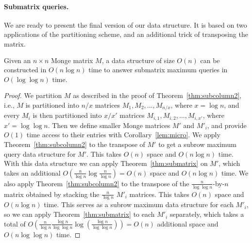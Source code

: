 \documentclass{llncs}
\begin{document}
\paragraph{\bf Submatrix queries.}
We are ready to present the final version of our data structure. It is based on two
applications of the partitioning scheme, and an additional trick of transposing the matrix.

\begin{theorem}
\label{thm:submatrix2}
Given an $n\times n$ Monge matrix $M$, a data structure of size $O(n)$ can be constructed
in $O(n\log n)$ time to answer submatrix maximum queries in $O(\log\log n)$ time.
\end{theorem}

\begin{proof}
We partition $M$ as described in the proof of Theorem~\ref{thm:subcolumn2}, i.e., $M$ is
partitioned into $n/x$ matrices $M_{1},M_{2},\ldots,M_{n/x}$, where $x=\log n$, and every $M_{i}$
is then partitioned into $x/x'$ matrices $M_{i,1},M_{i,2},\ldots,M_{i,x'}$, where $x'=\log\log n$.
Then we define smaller Monge matrices $M'$ and $M'_{i}$, and provide $O(1)$ time access to their
entries with Corollary~\ref{lem:micro}. We apply
Theorem~\ref{thm:subcolumn2} to the transpose of $M'$ to get a subrow
maximum query data structure for $M'$. This takes $O(n)$ space and
$O(n\log n)$ time. With this data structure we can apply Theorem~\ref{thm:submatrix} on
$M'$, which takes an additional $O(\frac{n}{\log n} \log \frac{n}{\log
  n}) = O(n)$ space and $O(n \log n)$ time. 
We also apply Theorem~\ref{thm:subcolumn2} to the transpose of the
$\frac{n}{\log\log n}$-by-$n$
matrix obtained by stacking the $\frac{n}{\log n}$ $M'_i$ matrices. 
This takes $O(n)$ space and
$O(n\log n)$ time. This serves as a subrow maximum data structure for
each $M'_i$, so we can apply Theorem~\ref{thm:submatrix} to each
$M'_i$ separately, which takes a total of  $O(\frac{n}{\log n}
\frac{\log n}{\log \log n}\log(\frac{\log n}{\log\log n})) = O(n)$ additional space and $O(n \log \log n)$ time. 





\end{proof}
\end{document}

